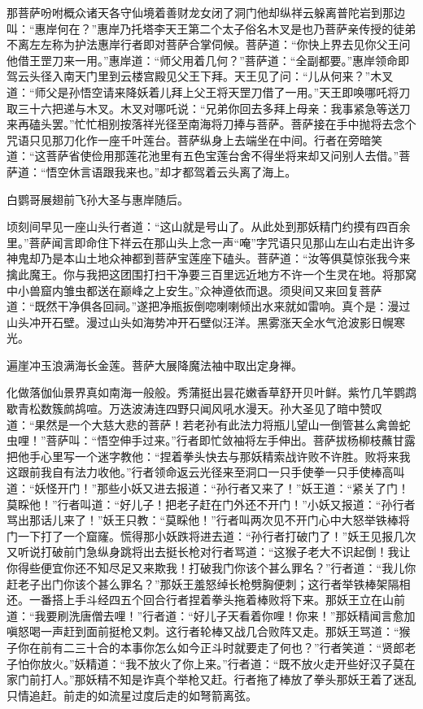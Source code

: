 \documentclass[12pt,UTF8]{ctexbook}
\begin{document}
{那菩萨吩咐概众诸天各守仙境着善财龙女闭了洞门他却纵祥云躲离普陀岩到那边叫：“惠岸何在？”惠岸乃托塔李天王第二个太子俗名木叉是也乃菩萨亲传授的徒弟不离左左称为护法惠岸行者即对菩萨合掌伺候。菩萨道：“你快上界去见你父王问他借王罡刀来一用。”惠岸道：“师父用着几何？”菩萨道：“全副都要。”惠岸领命即驾云头径入南天门里到云楼宫殿见父王下拜。天王见了问：“儿从何来？”木叉道：“师父是孙悟空请来降妖着儿拜上父王将天罡刀借了一用。”天王即唤哪吒将刀取三十六把递与木叉。木叉对哪吒说：“兄弟你回去多拜上母亲：我事紧急等送刀来再磕头罢。”忙忙相别按落祥光径至南海将刀捧与菩萨。菩萨接在手中抛将去念个咒语只见那刀化作一座千叶莲台。菩萨纵身上去端坐在中间。行者在旁暗笑道：“这菩萨省使俭用那莲花池里有五色宝莲台舍不得坐将来却又问别人去借。”菩萨道：“悟空休言语跟我来也。”却才都驾着云头离了海上。

白鹦哥展翅前飞孙大圣与惠岸随后。

顷刻间早见一座山头行者道：“这山就是号山了。从此处到那妖精门约摸有四百余里。”菩萨闻言即命住下祥云在那山头上念一声“唵”字咒语只见那山左山右走出许多神鬼却乃是本山土地众神都到菩萨宝莲座下磕头。菩萨道：“汝等俱莫惊张我今来擒此魔王。你与我把这团围打扫干净要三百里远近地方不许一个生灵在地。将那窝中小兽窟内雏虫都送在巅峰之上安生。”众神遵依而退。须臾间又来回复菩萨道：“既然干净俱各回祠。”遂把净瓶扳倒唿喇喇倾出水来就如雷响。真个是：漫过山头冲开石壁。漫过山头如海势冲开石壁似汪洋。黑雾涨天全水气沧波影日幌寒光。

遍崖冲玉浪满海长金莲。菩萨大展降魔法袖中取出定身禅。

化做落伽仙景界真如南海一般般。秀蒲挺出昙花嫩香草舒开贝叶鲜。紫竹几竿鹦鹉歇青松数簇鹧鸪喧。万迭波涛连四野只闻风吼水漫天。孙大圣见了暗中赞叹道：“果然是一个大慈大悲的菩萨！若老孙有此法力将瓶儿望山一倒管甚么禽兽蛇虫哩！”菩萨叫：“悟空伸手过来。”行者即忙敛袖将左手伸出。菩萨拔杨柳枝蘸甘露把他手心里写一个迷字教他：“捏着拳头快去与那妖精索战许败不许胜。败将来我这跟前我自有法力收他。”行者领命返云光径来至洞口一只手使拳一只手使棒高叫道：“妖怪开门！”那些小妖又进去报道：“孙行者又来了！”妖王道：“紧关了门！莫睬他！”行者叫道：“好儿子！把老子赶在门外还不开门！”小妖又报道：“孙行者骂出那话儿来了！”妖王只教：“莫睬他！”行者叫两次见不开门心中大怒举铁棒将门一下打了一个窟窿。慌得那小妖跌将进去道：“孙行者打破门了！”妖王见报几次又听说打破前门急纵身跳将出去挺长枪对行者骂道：“这猴子老大不识起倒！我让你得些便宜你还不知尽足又来欺我！打破我门你该个甚么罪名？”行者道：“我儿你赶老子出门你该个甚么罪名？”那妖王羞怒绰长枪劈胸便刺；这行者举铁棒架隔相还。一番搭上手斗经四五个回合行者捏着拳头拖着棒败将下来。那妖王立在山前道：“我要刷洗唐僧去哩！”行者道：“好儿子天看着你哩！你来！”那妖精闻言愈加嗔怒喝一声赶到面前挺枪又刺。这行者轮棒又战几合败阵又走。那妖王骂道：“猴子你在前有二三十合的本事你怎么如今正斗时就要走了何也？”行者笑道：“贤郎老子怕你放火。”妖精道：“我不放火了你上来。”行者道：“既不放火走开些好汉子莫在家门前打人。”那妖精不知是诈真个举枪又赶。行者拖了棒放了拳头那妖王着了迷乱只情追赶。前走的如流星过度后走的如弩箭离弦。

}
\end{document}
